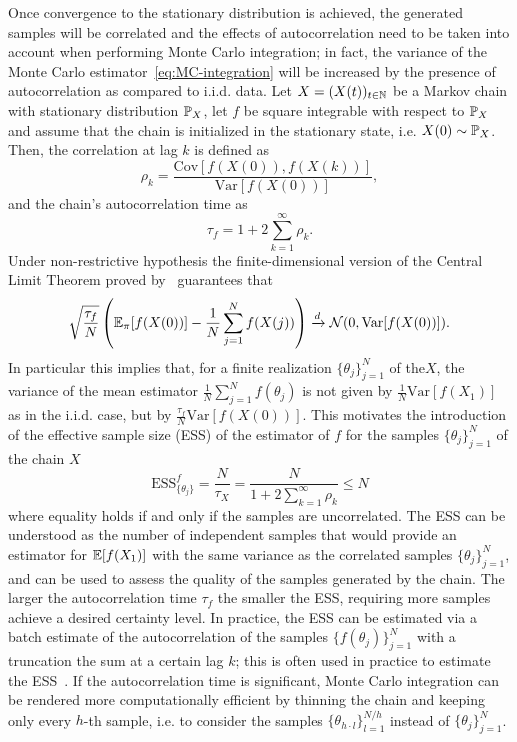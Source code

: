 Once convergence to the stationary distribution is achieved, the generated samples will be correlated and the effects of autocorrelation need to be taken into account when performing Monte Carlo integration; in fact, the variance of the Monte Carlo estimator~\eqref{eq:MC-integration} will be increased by the presence of autocorrelation as compared to i.i.d. data.
Let $X = (X(t))_{t\in \mathbb N}$ be a Markov chain with stationary distribution $\mathbb P_X$, let $f$ be square integrable with respect to $\mathbb P_X$ and assume that the chain is initialized in the stationary state, i.e. $X(0) \sim \mathbb P_X$.
Then, the correlation at lag $k$ is defined as
\[
    \rho_k = \frac{\text{Cov}[f(X(0)), f(X(k))]}{\text{Var}[f(X(0))]},
\]
and the chain's autocorrelation time as
\[
    \tau_f = 1 + 2 \sum_{k=1}^{\infty} \rho_k.
\]
Under non-restrictive hypothesis the finite-dimensional version of the Central Limit Theorem proved by~\cite{KipnisVaradhan1986} guarantees that 
\[
    \sqrt{\frac{\tau_f}{N}} \left(  \mathbb E_\pi [f(X(0))] - \frac{1}{N} \sum_{j=1}^{N} f(X(j)) \right) \xrightarrow{d} \mathcal N(0, \text{Var}[f(X(0))]).
\]
In particular this implies that, for a finite realization $\{ \theta_j\}_{j=1}^N$ of the$X$, the variance of the mean estimator $\frac{1}{N} \sum_{j=1}^{N} f(\theta_j)$ is not given by $\frac{1}{N} \text{Var}[f(X_1)]$ as in the i.i.d. case, but by $\frac{\tau_f}{N} \text{Var}[f(X(0))]$.
This motivates the introduction of the effective sample size (ESS) of the estimator of $f$ for the samples $\{\theta_j\}_{j=1}^N$ of the chain $X$
\begin{equation}
    \text{ESS}_{\{\theta_j\}}^f = \frac{N}{\tau_X} = \frac{N}{1 + 2 \sum_{k=1}^{\infty} \rho_k} \leq N
\end{equation}
where equality holds if and only if the samples are uncorrelated.
The ESS can be understood as the number of independent samples that would provide an estimator for $\mathbb E[f(X_1)]$ with the same variance as the correlated samples $\{\theta_j\}_{j=1}^N$, and can be used to assess the quality of the samples generated by the chain.
The larger the autocorrelation time $\tau_f$ the smaller the ESS, requiring more samples achieve a desired certainty level.
In practice, the ESS can be estimated via a batch estimate of the autocorrelation of the samples $\{f(\theta_j)\}_{j=1}^N$ with a truncation the sum at a certain lag $k$; this is often used in practice to estimate the ESS~\cite{Geyer1992}.
If the autocorrelation time is significant, Monte Carlo integration can be rendered more computationally efficient by thinning the chain and keeping only every $h$-th sample, i.e. to consider the samples $\{\theta_{h \cdot l}\}_{l=1}^{N/h}$ instead of $\{\theta_j\}_{j=1}^N$.\medskip

